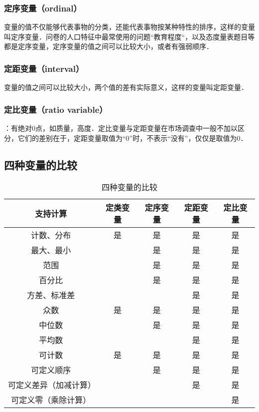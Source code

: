 \subsubsection{定序变量（ordinal）}
变量的值不仅能够代表事物的分类，还能代表事物按某种特性的排序，这样的变量叫定序变量．问卷的人口特征中最常使用的问题“教育程度“，以及态度量表题目等都是定序变量，定序变量的值之间可以比较大小，或者有强弱顺序．
\subsubsection{定距变量（interval）}
变量的值之间可以比较大小，两个值的差有实际意义，这样的变量叫定距变量．
\subsubsection{定比变量（ratio variable）}：有绝对0点，如质量，高度．定比变量与定距变量在市场调查中一般不加以区分，它们的差别在于，定距变量取值为“0”时，不表示“没有”，仅仅是取值为0．
\subsection{四种变量的比较}
\begin{table}[ht]
\centering
\caption{四种变量的比较}\label{DatTyp_tab1}
\begin{tabular}{|c|c|c|c|c|}
\hline
支持计算 & 定类变量 & 定序变量 & 定距变量 & 定比变量 \\
\hline
计数、分布 & 是 & 是 & 是 & 是 \\
\hline
最大、最小 &   & 是 & 是 & 是 \\
\hline
范围 &   & 是 & 是 & 是 \\
\hline
百分比 &   & 是 & 是 & 是 \\
\hline
方差、标准差 &   &   & 是 & 是 \\
\hline
众数 & 是 & 是 & 是 & 是 \\
\hline
中位数 &   & 是 & 是 & 是 \\
\hline
平均数 &   &   & 是 & 是 \\
\hline
可计数 & 是 & 是 & 是 & 是 \\
\hline
可定义顺序 &   & 是 & 是 & 是 \\
\hline
可定义差异（加减计算） &   &   & 是 & 是 \\
\hline
可定义零（乘除计算） &   &   &   & 是 \\
\hline
\end{tabular}
\end{table}
